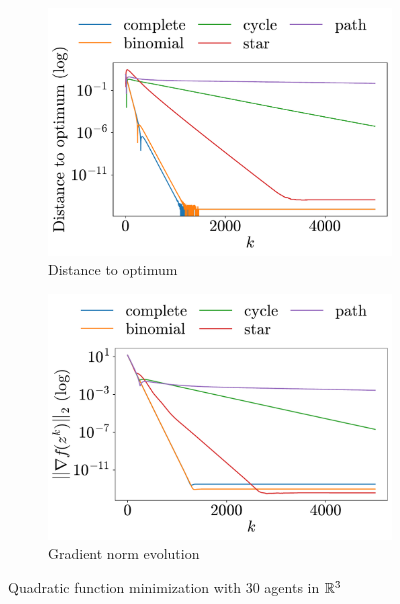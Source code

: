 \documentclass[a4paper,11pt,oneside]{book}
\begin{document}
\begin{figure}[t!]
      \centering
      \begin{subfigure}[h]{0.42\linewidth}
            \centering
            \includegraphics[width=\linewidth]{./figs/quadratic/30_3/distance.pdf} 
            \caption{Distance to optimum}
      \end{subfigure}
      \hfill
      \begin{subfigure}[h]{0.42\linewidth}
            \centering
            \includegraphics[width=\linewidth]{./figs/quadratic/30_3/gradient.pdf} 
            \caption{Gradient norm evolution}
      \end{subfigure}
      \caption{Quadratic function minimization with $30$ agents in ${\mathbb{R}}^{3}$}
      \label{fig:quadratic_30_3}
\end{figure}
\end{document}
